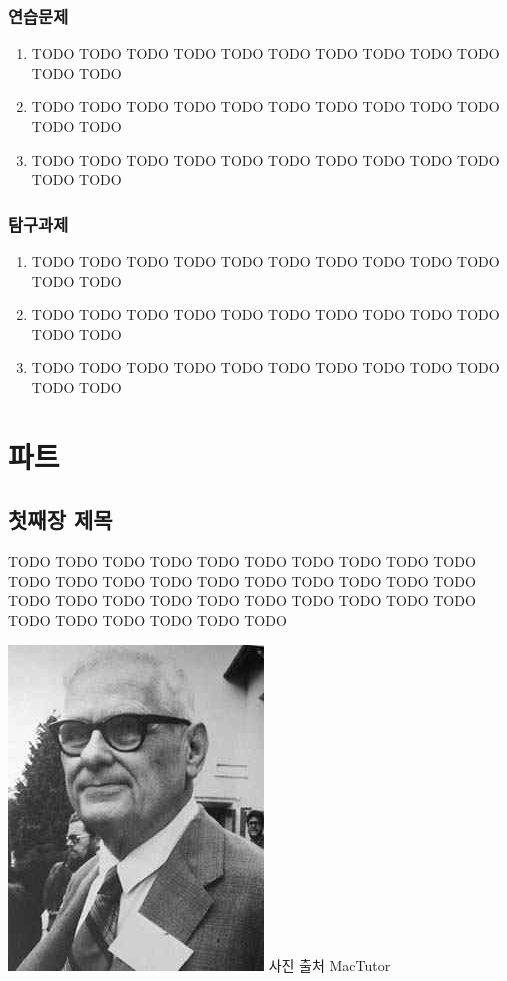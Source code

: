 \documentclass[b5paper,chapter,figtabcapt]{oblivoir}
\begin{document}
\section*{연습문제}
\begin{enumerate}
 \item TODO TODO TODO TODO TODO TODO TODO TODO TODO TODO TODO TODO
 \item TODO TODO TODO TODO TODO TODO TODO TODO TODO TODO TODO TODO
 \item TODO TODO TODO TODO TODO TODO TODO TODO TODO TODO TODO TODO
\end{enumerate}

\section*{탐구과제}
\begin{enumerate}
 \item TODO TODO TODO TODO TODO TODO TODO TODO TODO TODO TODO TODO
 \item TODO TODO TODO TODO TODO TODO TODO TODO TODO TODO TODO TODO
 \item TODO TODO TODO TODO TODO TODO TODO TODO TODO TODO TODO TODO
\end{enumerate}

\part{파트}

\chapter{첫째장 제목}
TODO TODO TODO TODO TODO TODO TODO TODO TODO TODO TODO TODO
TODO TODO TODO TODO TODO TODO TODO TODO TODO TODO TODO TODO
TODO TODO TODO TODO TODO TODO TODO TODO TODO TODO TODO TODO

\includegraphics[scale=.2]{AlonzoChurch.jpg} 사진 출처 MacTutor
\end{document}
